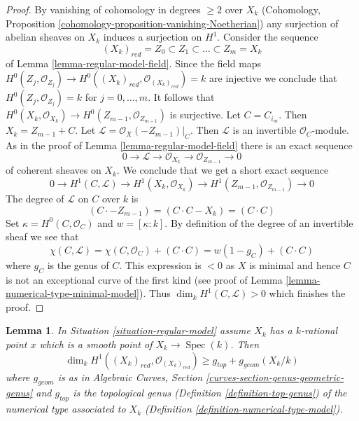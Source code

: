 \documentclass{stacks-project}
\theoremstyle{plain}
\newtheorem{lemma}[subsection]{Lemma}
\theoremstyle{definition}
\theoremstyle{remark}
\numberwithin{equation}{subsection}
\def\Spec{\mathop{\mathrm{Spec}}}
\begin{document}
\begin{proof}
By vanishing of cohomology in degrees $\geq 2$ over $X_k$
(Cohomology, Proposition \ref{cohomology-proposition-vanishing-Noetherian})
any surjection of abelian sheaves on $X_k$ induces a surjection on $H^1$.
Consider the sequence
$$
(X_k)_{red} = Z_0 \subset Z_1 \subset \ldots \subset Z_m = X_k
$$
of Lemma \ref{lemma-regular-model-field}. Since the field maps
$H^0(Z_j, \mathcal{O}_{Z_j}) \to
H^0((X_k)_{red}, \mathcal{O}_{(X_k)_{red}}) = k$
are injective we conclude that $H^0(Z_j, \mathcal{O}_{Z_j}) = k$ for
$j = 0, \ldots, m$. It follows that
$H^0(X_k, \mathcal{O}_{X_k}) \to H^0(Z_{m - 1}, \mathcal{O}_{Z_{m - 1}})$
is surjective. Let $C = C_{i_m}$. Then $X_k = Z_{m - 1} + C$.
Let $\mathcal{L} = \mathcal{O}_X(-Z_{m - 1})|_C$.
Then $\mathcal{L}$ is an invertible $\mathcal{O}_C$-module.
As in the proof of Lemma \ref{lemma-regular-model-field}
there is an exact sequence
$$
0 \to \mathcal{L} \to \mathcal{O}_{X_k} \to \mathcal{O}_{Z_{m - 1}} \to 0
$$
of coherent sheaves on $X_k$. We conclude that
we get a short exact sequence
$$
0 \to
H^1(C, \mathcal{L}) \to H^1(X_k, \mathcal{O}_{X_k}) \to
H^1(Z_{m - 1}, \mathcal{O}_{Z_{m - 1}}) \to 0
$$
The degree of $\mathcal{L}$ on $C$ over $k$ is
$$
(C \cdot -Z_{m - 1}) = (C \cdot C - X_k) = (C \cdot C)
$$
Set $\kappa = H^0(C, \mathcal{O}_C)$ and $w = [\kappa : k]$.
By definition of the degree of an invertible sheaf we see that
$$
\chi(C, \mathcal{L}) =
\chi(C, \mathcal{O}_C) + (C \cdot C) =
w(1 - g_C) + (C \cdot C)
$$
where $g_C$ is the genus of $C$. This expression is $< 0$ as $X$ is minimal
and hence $C$ is not an exceptional curve of the first kind
(see proof of Lemma \ref{lemma-numerical-type-minimal-model}).
Thus $\dim_k H^1(C, \mathcal{L}) > 0$ which finishes the proof.
\end{proof}

\begin{lemma}
\label{lemma-genus-reduction-bigger-than}
In Situation \ref{situation-regular-model} assume $X_k$ has a $k$-rational
point $x$ which is a smooth point of $X_k \to \Spec(k)$. Then
$$
\dim_k H^1((X_k)_{red}, \mathcal{O}_{(X_k)_{red}}) \geq
g_{top} + g_{geom}(X_k/k)
$$
where $g_{geom}$ is as in
Algebraic Curves, Section \ref{curves-section-genus-geometric-genus}
and $g_{top}$ is the topological genus
(Definition \ref{definition-top-genus})
of the numerical type associated to $X_k$
(Definition \ref{definition-numerical-type-model}).
\end{lemma}
\end{document}

